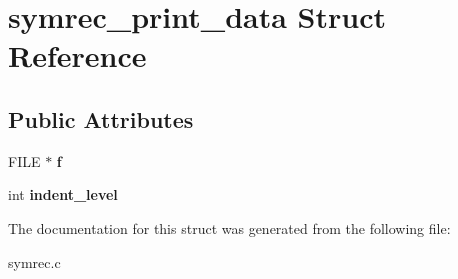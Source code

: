 \hypertarget{structsymrec__print__data}{\section{symrec\-\_\-print\-\_\-data Struct Reference}
\label{structsymrec__print__data}
}
\subsection*{Public Attributes}
\begin{DoxyCompactItemize}
\item 
\hypertarget{structsymrec__print__data_a8566464a336a37c6f44bd1d74c8f99a7}{F\-I\-L\-E $\ast$ {\bfseries f}}\label{structsymrec__print__data_a8566464a336a37c6f44bd1d74c8f99a7}

\item 
\hypertarget{structsymrec__print__data_ac563a7791481021a3fe87cd34d4f2bb8}{int {\bfseries indent\-\_\-level}}\label{structsymrec__print__data_ac563a7791481021a3fe87cd34d4f2bb8}

\end{DoxyCompactItemize}


The documentation for this struct was generated from the following file\-:\begin{DoxyCompactItemize}
\item 
symrec.\-c\end{DoxyCompactItemize}
